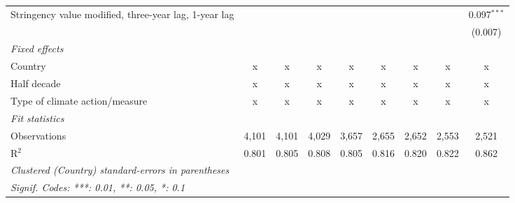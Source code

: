 \begin{table}[htbp]
\begin{tabular}{lcccccccc}
      Stringency value modified, three-year lag, 1-year lag                           &               &               &               &              &               &               &               & 0.097$^{***}$\\   
                                                                                      &               &               &               &              &               &               &               & (0.007)\\   
      \emph{Fixed effects}\\
      Country                                                                         & x             & x             & x             & x            & x             & x             & x             & x\\  
      Half decade                                                                     & x             & x             & x             & x            & x             & x             & x             & x\\  
      Type of climate action/measure                                                  & x             & x             & x             & x            & x             & x             & x             & x\\  
      \midrule \emph{Fit statistics}\\
      Observations                                                                    & 4,101         & 4,101         & 4,029         & 3,657        & 2,655         & 2,652         & 2,553         & 2,521\\  
      R$^2$                                                                           & 0.801         & 0.805         & 0.808         & 0.805        & 0.816         & 0.820         & 0.822         & 0.862\\  
      \midrule
      \multicolumn{9}{l}{\emph{Clustered (Country) standard-errors in parentheses}}\\
      \multicolumn{9}{l}{\emph{Signif. Codes: ***: 0.01, **: 0.05, *: 0.1}}\\
   \end{tabular}
\end{table}


